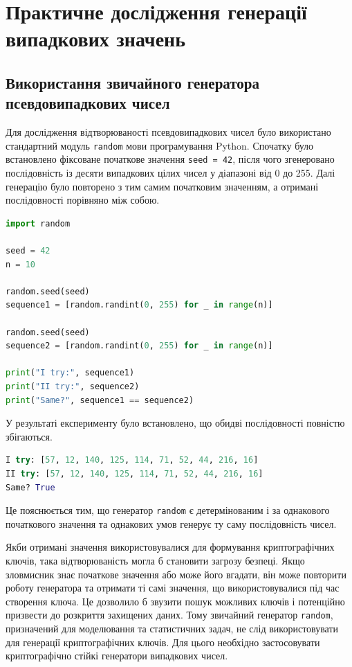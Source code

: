 \section{Практичне дослідження генерації випадкових значень}


\subsection{Використання звичайного генератора псевдовипадкових чисел}

Для дослідження відтворюваності псевдовипадкових чисел було використано стандартний модуль \texttt{random} 
мови програмування Python. Спочатку було встановлено фіксоване початкове значення \texttt{seed = 42}, 
після чого згенеровано послідовність із десяти випадкових цілих чисел у діапазоні від 0 до 255. 
Далі генерацію було повторено з тим самим початковим значенням, а отримані послідовності порівняно між собою.

\begin{lstlisting}[language=Python]
import random

seed = 42
n = 10

random.seed(seed)
sequence1 = [random.randint(0, 255) for _ in range(n)]

random.seed(seed)
sequence2 = [random.randint(0, 255) for _ in range(n)]

print("I try:", sequence1)
print("II try:", sequence2)
print("Same?", sequence1 == sequence2)
\end{lstlisting}

У результаті експерименту було встановлено, що обидві послідовності повністю збігаються. 

\begin{lstlisting}[language=Python]
I try: [57, 12, 140, 125, 114, 71, 52, 44, 216, 16]
II try: [57, 12, 140, 125, 114, 71, 52, 44, 216, 16]
Same? True
\end{lstlisting}

Це пояснюється тим, що генератор \texttt{random} є детермінованим і за однакового початкового 
значення та однакових умов генерує ту саму послідовність чисел.

Якби отримані значення використовувалися для формування криптографічних ключів, 
така відтворюваність могла б становити загрозу безпеці. Якщо зловмисник знає початкове значення 
або може його вгадати, він може повторити роботу генератора та отримати ті самі значення, 
що використовувалися під час створення ключа. Це дозволило б звузити пошук можливих ключів 
і потенційно призвести до розкриття захищених даних. Тому звичайний генератор \texttt{random}, 
призначений для моделювання та статистичних задач, не слід використовувати для генерації криптографічних ключів. 
Для цього необхідно застосовувати криптографічно стійкі генератори випадкових чисел.

